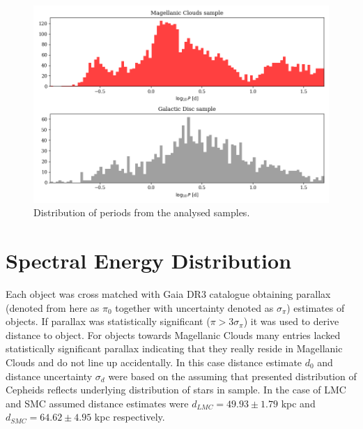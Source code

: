 \documentclass{pracalicmgr}
\begin{document}
\begin{figure}
    \includegraphics[scale=0.5]{plots/periods.png}
    \caption{Distribution of periods from the analysed samples.}
    \label{periods}
\end{figure}


\section{Spectral Energy Distribution}
Each object was cross matched  with Gaia DR3 catalogue obtaining parallax (denoted from here as $\pi_0$ together with uncertainty denoted as $\sigma_{\pi}$) estimates of objects. If parallax was statistically significant ($\pi>3\sigma_{\pi}$)
it was used to derive distance to object. For objects towards Magellanic Clouds many entries lacked statistically significant parallax indicating that they really reside in Magellanic Clouds
and do not line up accidentally.
In this case distance estimate $d_0$ and distance uncertainty $\sigma_d$ were based on the \citet{jacyszyn-dobrzeniecka_ogle-ing_2016} assuming that presented distribution 
of Cepheids reflects underlying distribution of stars in sample.
In the case of LMC and SMC assumed distance estimates were  $d_{LMC}=49.93\pm1.79$ kpc and  $d_{SMC}=64.62\pm4.95$ kpc respectively. 
\end{document}
